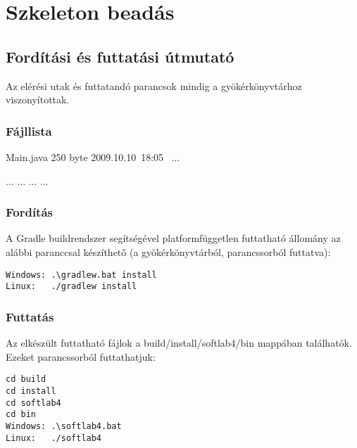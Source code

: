 %
\chapter{Szkeleton beadás}

\thispagestyle{fancy}

\section{Fordítási és futtatási útmutató}
Az elérési utak és futtatandó parancsok mindig a gyökérkönyvtárhoz viszonyítottak.

\subsection{Fájllista}

\begin{fajllista}

\fajl
{Main.java} %
{250 byte} %
{2009.10.10~18:05~} %
{...} %

\fajl
{...}
{...}
{...}
{...}

\end{fajllista}

\subsection{Fordítás}

A Gradle buildrendszer segítségével platformfüggetlen futtatható állomány az alábbi paranccsal készíthető (a gyökérkönyvtárból, parancssorból futtatva):
\lstset{escapeinside=`', xleftmargin=10pt, frame=single, basicstyle=\ttfamily\footnotesize, language=sh}
\begin{lstlisting}
Windows: .\gradlew.bat install
Linux:   ./gradlew install
\end{lstlisting}

\subsection{Futtatás}
Az elkészült futtatható fájlok a build/install/softlab4/bin mappában találhatók. 
Ezeket parancssorból futtathatjuk:
\lstset{escapeinside=`', xleftmargin=10pt, frame=single, basicstyle=\ttfamily\footnotesize, language=sh}
\begin{lstlisting}
cd build
cd install
cd softlab4
cd bin
Windows: .\softlab4.bat 
Linux:   ./softlab4
\end{lstlisting}


